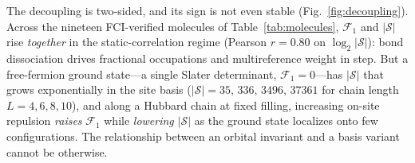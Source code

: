 The decoupling is two-sided, and its sign is not even stable (Fig.~\ref{fig:decoupling}). Across the
nineteen FCI-verified molecules of Table~\ref{tab:molecules}, $\mathcal F_1$ and $|\mathcal S|$ rise
\emph{together} in the static-correlation regime (Pearson $r=0.80$ on $\log_2|\mathcal S|$): bond
dissociation drives fractional occupations and multireference weight in step. But a free-fermion
ground state---a single Slater determinant, $\mathcal F_1=0$---has $|\mathcal S|$ that grows
exponentially in the site basis ($|\mathcal S|=35,\,336,\,3496,\,37361$ for chain length
$L=4,6,8,10$), and along a Hubbard chain at fixed filling, increasing on-site repulsion \emph{raises}
$\mathcal F_1$ while \emph{lowering} $|\mathcal S|$ as the ground state localizes onto few
configurations. The relationship between an orbital invariant and a basis variant cannot be otherwise.

